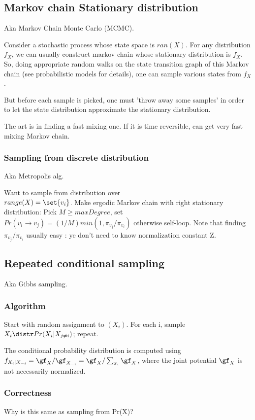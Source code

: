 \documentclass[oneside, article]{memoir}
\begin{document}
\subsection{Markov chain Stationary distribution}
Aka Markov Chain Monte Carlo (MCMC).

Consider a stochastic process whose state space is $ran(X)$. For any distribution $f_X$, we can usually construct markov chain whose stationary distribution is $f_X$. So, doing appropriate random walks on the state transition graph of this Markov chain (see probabilistic models for details), one can sample various states from $f_X$.

But before each sample is picked, one must 'throw away some samples' in order to let the state distribution approximate the stationary distribution.

The art is in finding a fast mixing one. If it is time reversible, can get very fast mixing Markov chain.

\subsubsection{Sampling from discrete distribution}
Aka Metropolis alg.

Want to sample from distribution over \\
$range(X) = \set{v_{i}}$. Make ergodic Markov chain with right stationary distribution: Pick $M \geq maxDegree$, set $Pr(v_{i} \to v_{j}) = (1/M)min(1, \pi_{v_{j}}/\pi_{v_{i}})$ otherwise self-loop. Note that finding $\pi_{v_{j}}/\pi_{v_{i}}$ usually easy : ye don't need to know normalization constant Z.

\subsection{Repeated conditional sampling}
Aka Gibbs sampling.

\subsubsection{Algorithm}
Start with random assignment to $(X_i)$. For each i, sample $X_i \distr Pr(X_i|X_{j\neq i})$; repeat.

The conditional probability distribution is computed using \\$f_{X_i|X_{-i}} = \gf_{X}/\gf_{X_{-i}} = \gf_{X}/\sum_{x_i} \gf_{X}$, where the joint potential $\gf_X$ is not necessarily normalized.

\subsubsection{Correctness}
Why is this same as sampling from Pr(X)? \why
\end{document}
